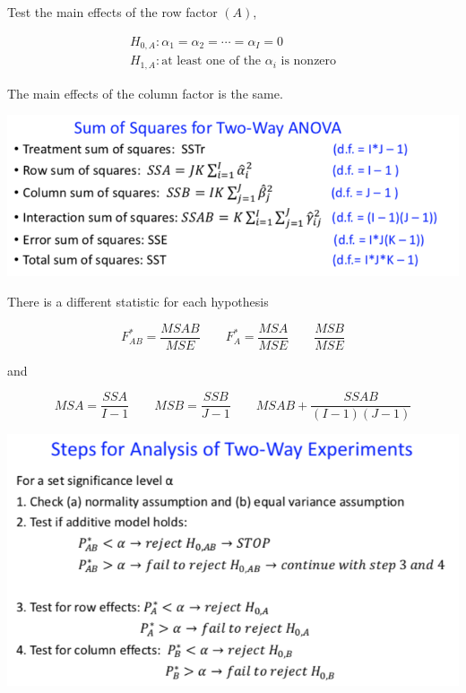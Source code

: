 \documentclass[9pt,landscape]{memoir}
\begin{document}
\begin{multicols}{3}
\begin{itemize}
            Test the main effects of the row factor $(A)$,

            \begin{align*}
                H_{0, A}: \alpha_1 = \alpha_2 = \cdots = \alpha_I = 0 \\
                H_{1, A}: \text{at least one of the $\alpha_i$ is nonzero}
            \end{align*}

            The main effects of the column factor is the same.
    \end{itemize}

    \includegraphics[width=.9\columnwidth]{degrees}

    There is a different statistic for each hypothesis

    \begin{equation*}
        F_{AB}^* = \frac{MSAB}{MSE} \qquad F_A ^* = \frac{MSA}{MSE} \qquad \frac{MSB}{MSE}
    \end{equation*}

    and

    \begin{equation*}
        MSA = \frac{SSA}{I - 1} \qquad MSB = \frac{SSB}{J - 1} \qquad MSAB + \frac{SSAB}{(I - 1)(J - 1)}
    \end{equation*}

    \includegraphics[width=\columnwidth]{steps-for-verification}


\end{multicols}
\end{document}
